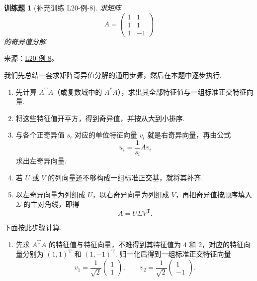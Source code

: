 \documentclass[UTF8,12pt,a4paper,fontset=fandol]{ctexart}
\newtheorem{exercise}{训练题}[section]
\begin{document}
\begin{exercise}[补充训练 L20-例-8]\label{prob:L20-例-8}
求矩阵
    \[
        A = \begin{pmatrix}
            1 & 1  \\
            1 & 1  \\
            1 & -1
        \end{pmatrix}
    \]
    的奇异值分解.
\end{exercise}
\noindent 来源：\href{https://github.com/yhwu-is/Linear-Algebra-Left-Undone/blob/new/%E8%AE%B2%E4%B9%89/%E4%B8%93%E9%A2%98/20%20%E5%86%85%E7%A7%AF%E7%A9%BA%E9%97%B4%E4%B8%8A%E7%9A%84%E7%AE%97%E5%AD%90.tex}{L20-例-8}。
\begin{solve}
我们先总结一套求矩阵奇异值分解的通用步骤，然后在本题中逐步执行.

    \begin{enumerate}
        \item 先计算 $A^{\mathrm{T}}A$（或复数域中的 $A^*A$），求出其全部特征值与一组标准正交特征向量.

        \item 将这些特征值开平方，得到奇异值，并按从大到小排序.

        \item 与各个正奇异值 $s_i$ 对应的单位特征向量 $v_i$ 就是右奇异向量，再由公式
              \[
                  u_i = \frac{1}{s_i}Av_i
              \]
              求出左奇异向量.

        \item 若 $U$ 或 $V$ 的列向量还不够构成一组标准正交基，就将其补齐.

        \item 以左奇异向量为列组成 $U$，以右奇异向量为列组成 $V$，再把奇异值按顺序填入 $\Sigma$ 的主对角线，即得
              \[
                  A = U\Sigma V^{\mathrm{T}}.
              \]
    \end{enumerate}

    下面按此步骤计算.

    \begin{enumerate}
        \item 先求 $A^{\mathrm{T}}A$ 的特征值与特征向量，不难得到其特征值为 $4$ 和 $2$，对应的特征向量分别为 $(1, 1)^{\mathrm{T}}$ 和 $(1, -1)^{\mathrm{T}}$. 归一化后得到一组标准正交特征向量
              \[
                  v_1 = \frac{1}{\sqrt{2}}\begin{pmatrix}
                      1 \\
                      1
                  \end{pmatrix},\qquad
                  v_2 = \frac{1}{\sqrt{2}}\begin{pmatrix}
                      1  \\
                      -1
                  \end{pmatrix}.
              \]


\end{enumerate}
\end{solve}
\end{document}
